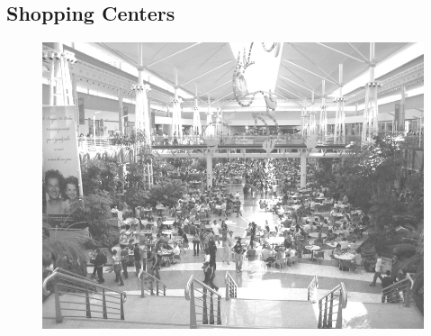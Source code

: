 \subsection{Shopping Centers}

\begin{figure}[h!]
    \centering
    \includegraphics[width=.45\textwidth]{img/barao/d_pedro.jpg}
\end{figure}

